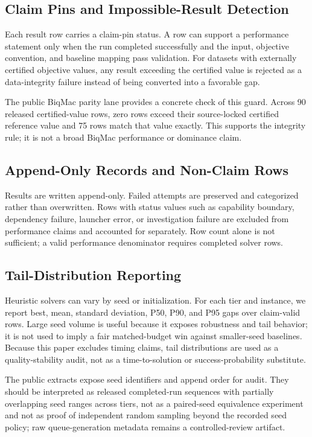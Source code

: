 \documentclass[11pt]{article}
\begin{document}
\subsection{Claim Pins and Impossible-Result Detection}
Each result row carries a claim-pin status. A row can support a performance statement only when the run completed successfully and the input, objective convention, and baseline mapping pass validation. For datasets with externally certified objective values, any result exceeding the certified value is rejected as a data-integrity failure instead of being converted into a favorable gap.

The public BiqMac parity lane provides a concrete check of this guard. Across 90 released certified-value rows, zero rows exceed their source-locked certified reference value and 75 rows match that value exactly. This supports the integrity rule; it is not a broad BiqMac performance or dominance claim.

\subsection{Append-Only Records and Non-Claim Rows}
Results are written append-only. Failed attempts are preserved and categorized rather than overwritten. Rows with status values such as capability boundary, dependency failure, launcher error, or investigation failure are excluded from performance claims and accounted for separately. Row count alone is not sufficient; a valid performance denominator requires completed solver rows.

\subsection{Tail-Distribution Reporting}
Heuristic solvers can vary by seed or initialization. For each tier and instance, we report best, mean, standard deviation, P50, P90, and P95 gaps over claim-valid rows. Large seed volume is useful because it exposes robustness and tail behavior; it is not used to imply a fair matched-budget win against smaller-seed baselines. Because this paper excludes timing claims, tail distributions are used as a quality-stability audit, not as a time-to-solution or success-probability substitute.

The public extracts expose seed identifiers and append order for audit. They should be interpreted as released completed-run sequences with partially overlapping seed ranges across tiers, not as a paired-seed equivalence experiment and not as proof of independent random sampling beyond the recorded seed policy; raw queue-generation metadata remains a controlled-review artifact.
\end{document}
